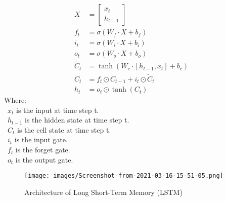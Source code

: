 \documentclass{ieeeojies}
\begin{document}
\begin{align*}
X &= \begin{bmatrix}
    x_t \\
    h_{t-1}
\end{bmatrix} \\
f_t &= \sigma(W_f \cdot X + b_f) \\
i_t &= \sigma(W_i \cdot X + b_i) \\
o_t &= \sigma(W_o \cdot X + b_o) \\
\tilde{C}_t &= \tanh(W_c \cdot [h_{t-1}, x_t] + b_c) \\
C_t &= f_t \odot C_{t-1} + i_t \odot \tilde{C}_t \\
h_t &= o_t \odot \tanh(C_t)
\end{align*}
Where:\\
\indent \textbullet\ \(x_t\) is the input at time step t.\\
\indent \textbullet\ \(h_{t-1}\) is the hidden state at time step t.\\
\indent \textbullet\ \(C_t\) is the cell state at time step t.\\
\indent \textbullet\ \(i_t\) is the input gate.\\
\indent \textbullet\ \(f_t\) is the forget gate.\\
\indent \textbullet\ \(o_t\) is the output gate.\\
\begin{figure}[H]
    \centering
    \texttt{[image: images/Screenshot-from-2021-03-16-15-51-05.png]}
    \caption{Architecture of Long Short-Term Memory (LSTM)}
    \label{fig:lstm_architecture}
\end{figure}
\end{document}

